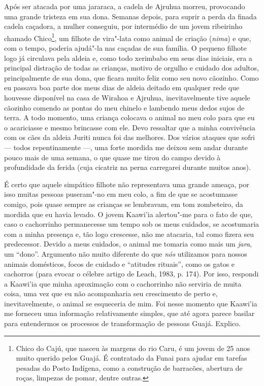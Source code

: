 Após ser atacada por uma jararaca, a cadela de Ajruhua morreu,
provocando uma grande tristeza em sua dona. Semanas depois, para suprir
a perda da finada cadela caçadora, a mulher conseguiu, por intermédio de
um jovem ribeirinho chamado Chico\footnote{Chico do Cajú, que nasceu às
  margens do rio Caru, é um jovem de 25 anos muito querido pelos Guajá.
  É contratado da Funai para ajudar em tarefas pesadas do Posto
  Indígena, como a construção de barracões, abertura de roças, limpezas
  de pomar, dentre outras.}, um filhote de vira"-lata como animal de
criação (\emph{nima}) e que, com o tempo, poderia ajudá"-la nas caçadas
de sua família. O pequeno filhote logo já circulava pela aldeia e, como
todo xerimbabo em seus dias iniciais, era a principal distração de todas
as crianças, motivo de orgulho e cuidado dos adultos, principalmente de
sua dona, que ficara muito feliz como seu novo cãozinho. Como eu passava
boa parte dos meus dias de aldeia deitado em qualquer rede que houvesse
disponível na casa de Wirahoa e Ajruhua, inevitavelmente tive aquele
cãozinho comendo as pontas do meu chinelo e lambendo meus dedos sujos de
terra. A todo momento, uma criança colocava o animal no meu colo para
que eu o acariciasse e mesmo brincasse com ele. Devo ressaltar que a
minha convivência com os cães da aldeia Juriti nunca foi das melhores.
Dos vários ataques que sofri --- todos repentinamente ---, uma forte mordida
me deixou sem andar durante pouco mais de uma semana, o que quase me
tirou do campo devido à profundidade da ferida (cuja cicatriz na perna
carregarei durante muitos anos).

É certo que aquele simpático filhote não representava uma grande ameaça,
por isso muitas pessoas puseram"-no em meu colo, a fim de que se
acostumasse comigo, pois quase sempre as crianças se lembravam, em tom
zombeteiro, da mordida que eu havia levado. O jovem Kaawi'ia alertou"-me
para o fato de que, caso o cachorrinho permanecesse um tempo sob os meus
cuidados, se acostumaria com a minha presença e, tão logo crescesse, não
me atacaria, tal como fizera seu predecessor. Devido a meus cuidados, o
animal me tomaria como mais um \emph{jara}, um ``dono''. Argumento não
muito diferente do que \emph{nós} utilizamos para nossos animais
domésticos, focos de cuidado e ``atitudes rituais'', como os gatos e
cachorros (para evocar o célebre artigo de Leach, 1983, p. 174). Por
isso, respondi a Kaawi'ia que minha aproximação com o cachorrinho não
serviria de muita coisa, uma vez que eu não acompanharia seu crescimento
de perto e, inevitavelmente, o animal se esqueceria de mim. Foi nesse
momento que Kaawi'ia me forneceu uma informação relativamente simples,
que até agora parece basilar para entendermos os processos de
transformação de pessoas Guajá. Explico.


